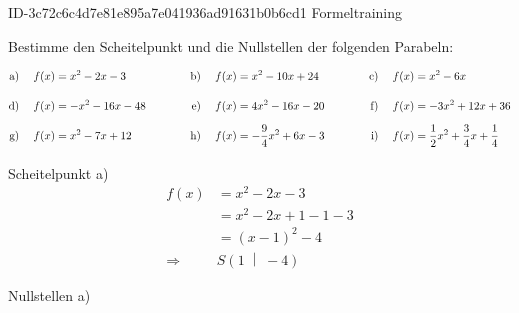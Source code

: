 \begin{exercise}
      {ID-3c72c6c4d7e81e895a7e041936ad91631b0b6cd1}
      {Formeltraining}
  \ifproblem\problem\par
    Bestimme den Scheitelpunkt und die Nullstellen der folgenden Parabeln:
    \newcommand{\exchar}[1]{\vphantom{\frac{f}{f}}\text{#1}&\;}%
    \begin{alignat*}{8}
      \exchar{a)}
      &
      f(x)&=x^2-2x-3
      &
      \quad&\quad
      &
      \exchar{b)}
      &
      f(x)&=x^2-10x+24
      &
      \quad&\quad
      &
      \exchar{c)}
      &
      f(x)&=x^2-6x
      \\
      \exchar{d)}
      &
      f(x)&=-x^2-16x-48
      &
      \quad&\quad
      &
      \exchar{e)}
      &
      f(x)&=4x^2-16x-20
      &
      \quad&\quad
      &
      \exchar{f)}
      &
      f(x)&=-3x^2+12x+36
      \\
      \exchar{g)}
      &
      f(x)&=x^2-7x+12
      &
      \quad&\quad
      &
      \exchar{h)}
      &
      f(x)&=-\frac{9}{4}x^2+6x-3
      &
      \quad&\quad
      &
      \exchar{i)}
      &
      f(x)&=\frac{1}{2}x^2+\frac{3}{4}x+\frac{1}{4}
    \end{alignat*}
  \fi
  \ifoutcome\outcome\par
    \begin{minipage}[t]{0.49\linewidth}
      Scheitelpunkt a)
      \small
      \begin{equation*}
        \begin{split}
          f(x)&=x^{2}-2x-3
          \\
          &=x^2-2x+1-1-3
          \\
          &=(x-1)^2-4
          \\[1ex]
          \Rightarrow\quad&S\left(1\;\middle|\;-4\right)
        \end{split}
      \end{equation*}
    \end{minipage}%
    \hfill
    \begin{minipage}[t]{0.49\linewidth}
      Nullstellen a)
      \small
      \begingroup
        \newcommand{\vstrut}{\vphantom{\left(f_0^0\right)}}%
        \newcommand{\noeq}{\phantom{\Leftrightarrow}\vstrut&\quad}%
        \newcommand{\iseq}{\Leftrightarrow\vstrut&\quad}%
        \newcommand{\impl}{\Rightarrow\vstrut&\quad}%
        \newcommand{\nomod}{\quad&\phantom{|}}%

\end{minipage}
\end{exercise}

